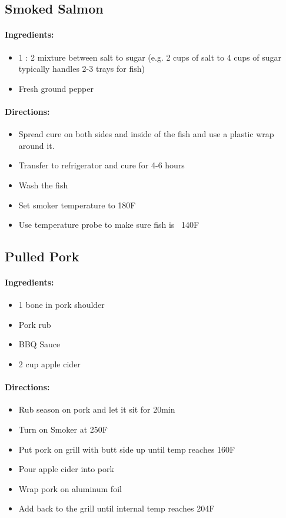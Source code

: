 \documentclass{article}
\begin{document}
\subsection{Smoked Salmon}{}

\paragraph{Ingredients:}

\begin{itemize}
	\item 1 : 2 mixture between salt to sugar (e.g. 2 cups of salt to 4 cups of sugar typically handles 2-3 trays for fish)
	\item Fresh ground pepper
\end{itemize}

\paragraph{Directions:}
\begin{itemize}
	\item Spread cure on both sides and inside of the fish and use a plastic wrap around it.
	\item Transfer to refrigerator and cure for 4-6 hours
	\item Wash the fish
	\item Set smoker temperature to 180F
	\item Use temperature probe to make sure fish is ~140F
\end{itemize}


\subsection{Pulled Pork}{}

\paragraph{Ingredients:}

\begin{itemize}
	\item 1 bone in pork shoulder
	\item Pork rub
	\item BBQ Sauce
	\item 2 cup apple cider
\end{itemize}

\paragraph{Directions:}
\begin{itemize}
	\item Rub season on pork and let it sit for 20min
	\item Turn on Smoker at 250F
	\item Put pork on grill with butt side up until temp reaches 160F
	\item Pour apple cider into pork
	\item Wrap pork on aluminum foil
	\item Add back to the grill until internal temp reaches 204F
\end{itemize}
\end{document}
